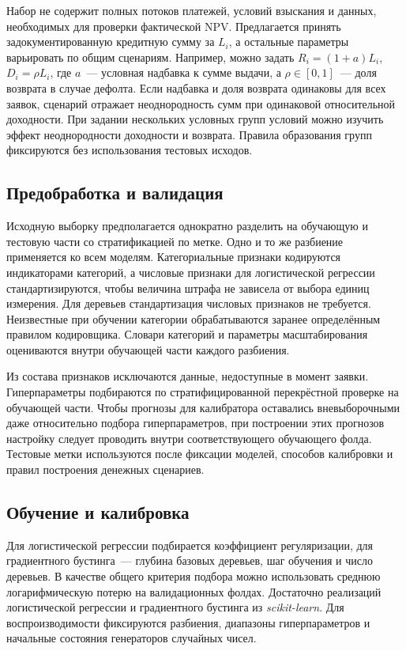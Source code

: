 \documentclass{misisarticle}
\begin{document}
Набор не содержит полных потоков платежей, условий взыскания и данных, необходимых для проверки фактической NPV. Предлагается принять задокументированную кредитную сумму за $L_i$, а остальные параметры варьировать по общим сценариям. Например, можно задать $R_i=(1+a)L_i$, $D_i=\rho L_i$, где $a$~--- условная надбавка к сумме выдачи, а $\rho\in[0,1]$~--- доля возврата в случае дефолта. Если надбавка и доля возврата одинаковы для всех заявок, сценарий отражает неоднородность сумм при одинаковой относительной доходности. При задании нескольких условных групп условий можно изучить эффект неоднородности доходности и возврата. Правила образования групп фиксируются без использования тестовых исходов.

\subsection{Предобработка и валидация}

Исходную выборку предполагается однократно разделить на обучающую и тестовую части со стратификацией по метке. Одно и то же разбиение применяется ко всем моделям. Категориальные признаки кодируются индикаторами категорий, а числовые признаки для логистической регрессии стандартизируются, чтобы величина штрафа не зависела от выбора единиц измерения. Для деревьев стандартизация числовых признаков не требуется. Неизвестные при обучении категории обрабатываются заранее определённым правилом кодировщика. Словари категорий и параметры масштабирования оцениваются внутри обучающей части каждого разбиения.

Из состава признаков исключаются данные, недоступные в момент заявки. Гиперпараметры подбираются по стратифицированной перекрёстной проверке на обучающей части. Чтобы прогнозы для калибратора оставались вневыборочными даже относительно подбора гиперпараметров, при построении этих прогнозов настройку следует проводить внутри соответствующего обучающего фолда. Тестовые метки используются после фиксации моделей, способов калибровки и правил построения денежных сценариев.

\subsection{Обучение и калибровка}

Для логистической регрессии подбирается коэффициент регуляризации, для градиентного бустинга~--- глубина базовых деревьев, шаг обучения и число деревьев. В качестве общего критерия подбора можно использовать среднюю логарифмическую потерю на валидационных фолдах. Достаточно реализаций логистической регрессии и градиентного бустинга из \textit{scikit-learn}. Для воспроизводимости фиксируются разбиения, диапазоны гиперпараметров и начальные состояния генераторов случайных чисел.
\end{document}
